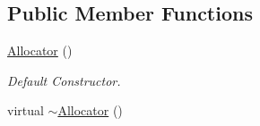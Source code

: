\subsection*{Public Member Functions}
\begin{DoxyCompactItemize}
\item 
\hyperlink{classDE_1_1Allocator_ab6534df8f8e4c8b28ca129687bec3b26}{Allocator} ()\hypertarget{classDE_1_1Allocator_ab6534df8f8e4c8b28ca129687bec3b26}{}\label{classDE_1_1Allocator_ab6534df8f8e4c8b28ca129687bec3b26}

\begin{DoxyCompactList}\small\item\em Default Constructor. \end{DoxyCompactList}\item 
virtual \hyperlink{classDE_1_1Allocator_a8d95aa03ec7c7801d06a23f5f453961d}{$\sim$\+Allocator} ()\hypertarget{classDE_1_1Allocator_a8d95aa03ec7c7801d06a23f5f453961d}{}\label{classDE_1_1Allocator_a8d95aa03ec7c7801d06a23f5f453961d}


\end{DoxyCompactItemize}
